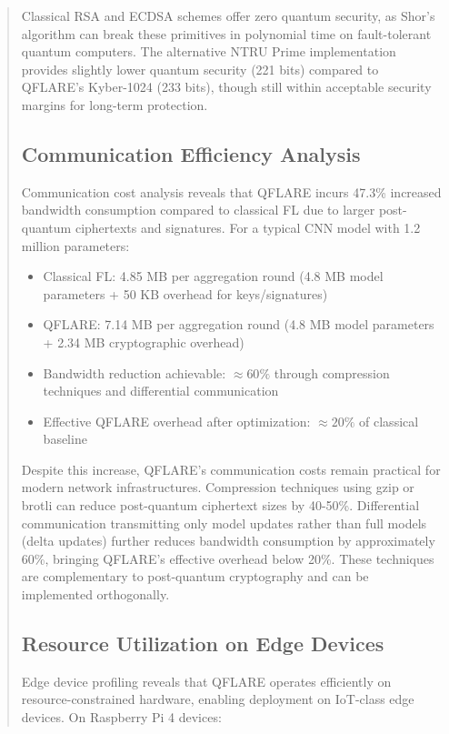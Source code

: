 \documentclass{svproc}
\begin{document}
\begin{abstract}
Classical RSA and ECDSA schemes offer zero quantum security, as Shor's algorithm can break these primitives in polynomial time on fault-tolerant quantum computers. The alternative NTRU Prime implementation provides slightly lower quantum security (221 bits) compared to QFLARE's Kyber-1024 (233 bits), though still within acceptable security margins for long-term protection.

\subsection{Communication Efficiency Analysis}

Communication cost analysis reveals that QFLARE incurs 47.3\% increased bandwidth consumption compared to classical FL due to larger post-quantum ciphertexts and signatures. For a typical CNN model with 1.2 million parameters:

\begin{itemize}
    \item Classical FL: 4.85 MB per aggregation round (4.8 MB model parameters + 50 KB overhead for keys/signatures)
    \item QFLARE: 7.14 MB per aggregation round (4.8 MB model parameters + 2.34 MB cryptographic overhead)
    \item Bandwidth reduction achievable: $\approx 60\%$ through compression techniques and differential communication
    \item Effective QFLARE overhead after optimization: $\approx 20\%$ of classical baseline
\end{itemize}

Despite this increase, QFLARE's communication costs remain practical for modern network infrastructures. Compression techniques using gzip or brotli can reduce post-quantum ciphertext sizes by 40-50\%. Differential communication transmitting only model updates rather than full models (delta updates) further reduces bandwidth consumption by approximately 60\%, bringing QFLARE's effective overhead below 20\%. These techniques are complementary to post-quantum cryptography and can be implemented orthogonally.

\subsection{Resource Utilization on Edge Devices}

Edge device profiling reveals that QFLARE operates efficiently on resource-constrained hardware, enabling deployment on IoT-class edge devices. On Raspberry Pi 4 devices:


\end{abstract}
\end{document}
